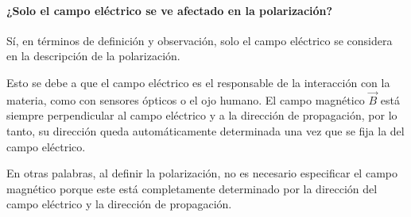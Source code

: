 \paragraph{¿Solo el campo eléctrico se ve afectado en la polarización?}

Sí, en términos de definición y observación, solo el campo eléctrico se considera en la descripción de la polarización.

Esto se debe a que el campo eléctrico es el responsable de la interacción con la materia, como con sensores ópticos o el ojo humano. El campo magnético \(\vec{B}\) está siempre perpendicular al campo eléctrico y a la dirección de propagación, por lo tanto, su dirección queda automáticamente determinada una vez que se fija la del campo eléctrico.

En otras palabras, al definir la polarización, no es necesario especificar el campo magnético porque este está completamente determinado por la dirección del campo eléctrico y la dirección de propagación.